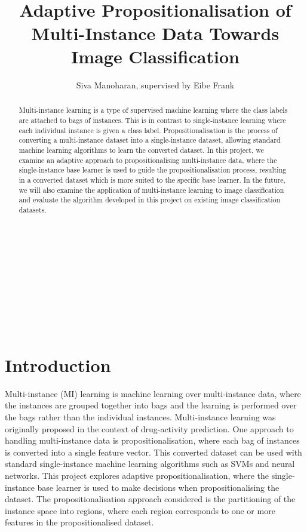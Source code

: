 \documentclass[a4paper,12pt]{article} %
\title{\ \\ \  \\ Adaptive Propositionalisation of Multi-Instance Data Towards Image Classification}
\author{Siva Manoharan, supervised by Eibe Frank}
\begin{document}
\onehalfspacing
{}  %

\maketitle 
\ \\ \ \\ \ \\ \ \\ \ \\ \ \\ \ %
\begin{abstract}
Multi-instance learning is a type of supervised machine learning 
    where the class labels are attached to bags of instances. 
This is in contrast to single-instance learning 
    where each individual instance is given a class label.
Propositionalisation is the process of 
    converting a multi-instance dataset into a single-instance dataset, 
    allowing standard machine learning algorithms to learn the converted dataset. 
In this project, 
    we examine an adaptive approach to propositionalising multi-instance data, 
    where the single-instance base learner is 
    used to guide the propositionalisation process, 
    resulting in a converted dataset 
    which is more suited to the specific base learner.
In the future, 
    we will also examine the application of multi-instance learning 
    to image classification and 
    evaluate the algorithm developed in this project 
    on existing image classification datasets.
\end{abstract}

\thispagestyle{empty}
\clearpage
{}  

\section{Introduction} 

Multi-instance (MI) learning is 
    machine learning over multi-instance data, 
    where the instances are grouped together into bags and 
    the learning is performed over the bags 
    rather than the individual instances.
Multi-instance learning was originally proposed 
    in the context of drug-activity prediction.
One approach to handling multi-instance data is propositionalisation, 
    where each bag of instances is converted into 
    a single feature vector. 
This converted dataset can be used with 
    standard single-instance machine learning algorithms 
    such as SVMs and neural networks.
This project explores adaptive propositionalisation, 
    where the single-instance base learner is used to 
    make decisions when propositionalising the dataset. 
The propositionalisation approach considered is the 
    partitioning of the instance space into regions, 
    where each region corresponds to 
    one or more features in the propositionalised dataset.
\end{document}
